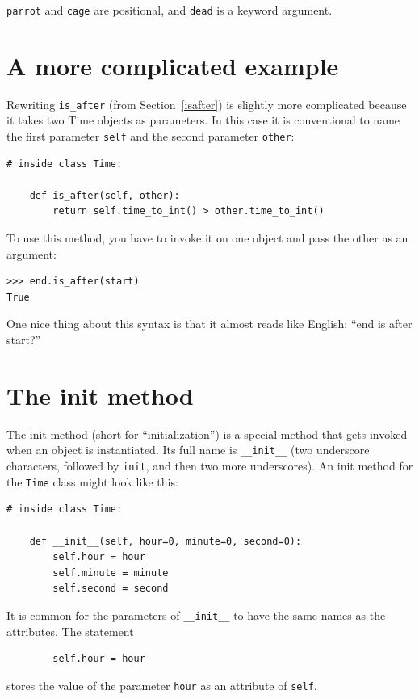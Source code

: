 \documentclass[10pt]{book}
\begin{document}
{\tt parrot} and {\tt cage} are positional, and {\tt dead} is
a keyword argument.


\section{A more complicated example}

Rewriting \verb"is_after" (from Section~\ref{isafter}) is slightly
more complicated because it takes two Time objects as parameters.  In
this case it is conventional to name the first parameter {\tt self}
and the second parameter {\tt other}: 

\begin{verbatim}
# inside class Time:

    def is_after(self, other):
        return self.time_to_int() > other.time_to_int()
\end{verbatim}
%
To use this method, you have to invoke it on one object and pass
the other as an argument:

\begin{verbatim}
>>> end.is_after(start)
True
\end{verbatim}
%
One nice thing about this syntax is that it almost reads
like English: ``end is after start?''


\section{The init method}

The init method (short for ``initialization'') is
a special method that gets invoked when an object is instantiated.  
Its full name is \verb"__init__" (two underscore characters,
followed by {\tt init}, and then two more underscores).  An
init method for the {\tt Time} class might look like this:

\begin{verbatim}
# inside class Time:

    def __init__(self, hour=0, minute=0, second=0):
        self.hour = hour
        self.minute = minute
        self.second = second
\end{verbatim}
%
It is common for the parameters of \verb"__init__"
to have the same names as the attributes.  The statement

\begin{verbatim}
        self.hour = hour
\end{verbatim}
%
stores the value of the parameter {\tt hour} as an attribute
of {\tt self}.
\end{document}
